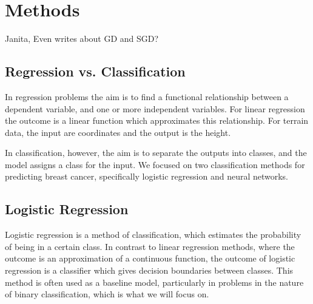 \section{Methods}\label{sec:methods}
Janita, Even writes about GD and SGD?
\subsection{Regression vs. Classification}\label{ssec:regression_classification}
In regression problems the aim is to find a functional relationship between a dependent variable, and one or more independent variables. For linear regression the outcome is a linear function which approximates this relationship. For terrain data, the input are coordinates and the output is the height.

In classification, however, the aim is to separate the outputs into classes, and the model assigns a class for the input. We focused on two classification methods for predicting breast cancer, specifically logistic regression and neural networks.


\subsection{Logistic Regression}\label{ssec:logreg}
Logistic regression is a method of classification, which estimates the probability of being in a certain class. In contrast to linear regression methods, where the outcome is an approximation of a continuous function, the outcome of logistic regression is a classifier which gives decision boundaries between classes. This method is often used as a baseline model, particularly in problems in the nature of binary classification, which is what we will focus on.

